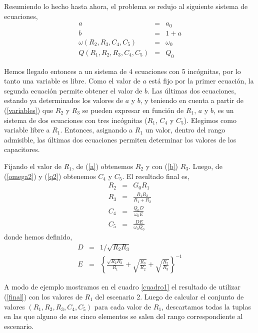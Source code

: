 \documentclass{llncs}
\begin{document}
	Resumiendo lo hecho hasta ahora, el problema se redujo al siguiente sistema de ecuaciones,
	\begin{eqnarray}
	a&=&a_0\label{a}\\
	b&=&1+a\label{b}\\
	\omega(R_2,R_3,C_4,C_5)&=&\omega_0\label{omega2}\\
	Q(R_1,R_2,R_3,C_4,C_5)&=&Q_0\label{q2}
	\label{opti4}
	\end{eqnarray}
	
	Hemos llegado entonces a un sistema de 4 ecuaciones con 5 incógnitas, por lo tanto una variable es
	libre. Como el valor de $a$ está fijo por la primer ecuación, la segunda ecuación permite obtener el valor de $b$. 
	Las últimas dos ecuaciones, estando ya determinados los valores de $a$ y $b$, y teniendo en cuenta a partir de
	(\ref{variables}) que $R_2$ y $R_3$ se pueden expresar en función de $R_1$, $a$ y $b$, es un sistema de dos ecuaciones 
	con tres  incógnitas ($R_1$, $C_4$ y $C_5$). Elegimos como variable libre a $R_1$. Entonces, asignando a $R_1$ un valor, 
	dentro del rango admisible, las últimas dos ecuaciones permiten determinar los valores de los capacitores.
	
	Fijando el valor de $R_1$, de (\ref{a}) obtenemos $R_2$ y con (\ref{b}) $R_3$. Luego, de (\ref{omega2}) y 
	(\ref{q2}) obtenemos $C_4$ y $C_5$. El resultado final es,
	\begin{eqnarray}
	\label{eqarr:solAnalitica}
	R_2&=&G_0 R_1\nonumber\\
	R_3&=&\frac{R_1 R_2}{R_1+ R_2}\nonumber\\
	C_4&=&\frac{Q_0 D}{\omega_0 E}\\
	C_5&=&\frac{D E}{\omega_0 Q_0}\nonumber\label{final}
	\end{eqnarray}
	donde hemos definido,
	\begin{eqnarray}
	D&=&1/\sqrt{R_2 R_3}\nonumber\\
	E&=&\left\{\frac{\sqrt{R_2R_3}}{R_1} +
	\sqrt{\frac{R_3}{R_2}} +\sqrt{\frac{R_2}{R_3}}\right\}^{-1}
	\end{eqnarray}
	
	A modo de ejemplo mostramos en el cuadro \ref{cuadro1} el resultado de utilizar (\ref{final}) con los valores de $R_1$ del escenario 2. 
	Luego de calcular el conjunto de valores $(R_1,R_2,R_3,C_4,C_5)$ para cada valor de $R_1$, descartamos todas la
	tuplas en las que alguno de sus cinco elementos se salen del rango correspondiente al escenario.
	
\end{document}
